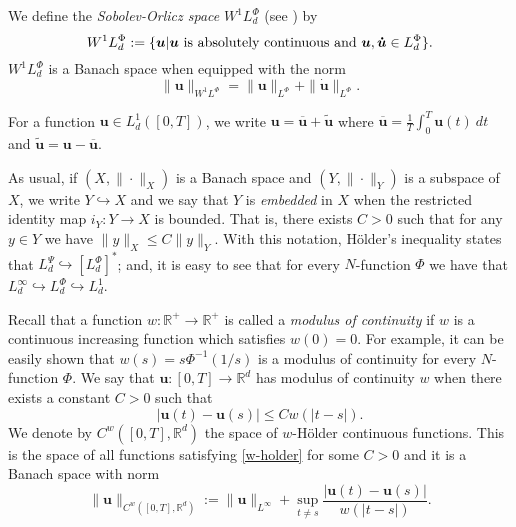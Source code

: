 \documentclass[twoside]{elsarticle}
\theoremstyle{remark}
\newcommand{\orlnor}{\|_{L^{\Phi}}}
\newcommand{\lphi}{L^{\Phi}}
\newcommand{\lpsi}{L^{\Psi}}
\newcommand{\wphi}{W^{1}\lphi}
\renewcommand{\b}[1]{\boldsymbol{#1}}
\newcommand{\rr}{\mathbb{R}}
\renewcommand{\leq}{\leqslant}
\begin{document}
We define the \emph{Sobolev-Orlicz space} $\wphi_d$ (see \cite{adams_sobolev}) by
\[\wphi_d:=\{\b{u}| \b{u} \hbox{ is absolutely continuous and } \b{u},\b{\dot{u}}\in \lphi_d\}.\]
$\wphi_d$ is a Banach space when equipped with the norm
\[
\|  \b{u}  \|_{\wphi}= \|  \b{u}  \|_{\lphi} + \|\b{\dot{u}}\orlnor.
\]



For a  function $\b{u}\in L^1_d([0,T])$, we write $\b{u}=\overline{\b{u}}+\widetilde{\b{u}}$ where $\overline{\b{u}} =\frac1T\int_0^T \b{u}(t)\ dt$ and $\widetilde{\b{u}}=\b{u}-\overline{\b{u}}$.

As usual, if $(X,\|\cdot\|_X)$ is a Banach space and $(Y,\|\cdot \|_Y)$ is a subspace of $X$,  we write $Y\hookrightarrow X$ and we say that $Y$ is \emph{embedded} in $X$  when the restricted identity map $i_Y:Y\to X$ is bounded. That is, there exists $C>0$ such that  for any $y\in Y$ we have $\|y\|_X\leq C\|y\|_Y$.  With this notation, H\"older's inequality states that  $\lpsi_d\hookrightarrow  \left[\lphi_d\right]^*$; and, it is easy to see that for every $N$-function $\Phi$ we have that $L^{\infty}_d\hookrightarrow\lphi_d \hookrightarrow L^1_d$.


 Recall that a function   $w:\mathbb{R}^+\to \mathbb{R}^+$ is called  a \emph{modulus of continuity} if $w$ is a continuous increasing function which satisfies $w(0)=0$. For example, it can be easily shown that $w(s)=s\Phi^{-1}(1/s)$ is a modulus of  continuity for every $N$-function $\Phi$.  We say that $\b{u}:[0,T]\to\rr^d$  has modulus of continuity $w$  when there exists a constant $C>0$ such that 
\begin{equation}\label{w-holder}|\b{u}(t)-\b{u}(s)|\leq Cw(|t-s|).
\end{equation}
We denote by $C^w([0,T],\rr^d)$  the space of  $w$-H\"older continuous functions. This is the space of all functions satisfying \eqref{w-holder} for some $C>0$ and it is a Banach space with norm
\[\|\b{u}\|_{  C^w([0,T],\rr^d) }  :=\|\b{u}\|_{L^{\infty}}+\sup\limits_{t\neq s}\frac{|\b{u}(t)-\b{u}(s)|}{w(|t-s|)}.\]
\end{document}
